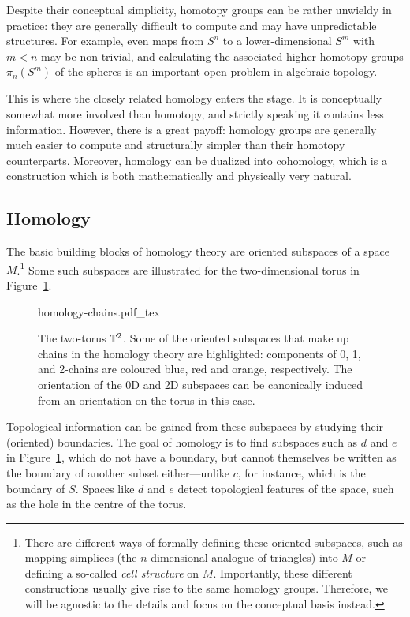Despite their conceptual simplicity, homotopy groups can be rather unwieldy in practice: they are generally difficult to compute and may have unpredictable structures. For example, even maps from $S^n$ to a lower-dimensional $S^m$ with $m<n$ may be non-trivial, and calculating the associated higher homotopy groups $\pi_n(S^m)$ of the spheres is an important open problem in algebraic topology.

This is where the closely related homology enters the stage. It is conceptually somewhat more involved than homotopy, and strictly speaking it contains less information. However, there is a great payoff: homology groups are generally much easier to compute and structurally simpler than their homotopy counterparts. Moreover, homology can be dualized into cohomology, which is a construction which is both mathematically and physically very natural.


\subsection{Homology}

The basic building blocks of homology theory are oriented subspaces of a space $M$.\footnote{
	There are different ways of formally defining these oriented subspaces, such as mapping simplices (the $n$-dimensional analogue of triangles) into $M$ or defining a so-called \emph{cell structure} on $M$. Importantly, these different constructions usually give rise to the same homology groups. Therefore, we will be agnostic to the details and focus on the conceptual basis instead.} %
Some such subspaces are illustrated for the two-dimensional torus in Figure~\ref{fig:homology-chains}.
\begin{figure}[htb!]
	\centering
	\def\svgwidth{.6\linewidth}
	{homology-chains.pdf_tex}
	\caption{The two-torus $\mathbb{T}^2$. Some of the oriented subspaces that make up chains in the homology theory are highlighted: components of 0, 1, and 2-chains are coloured blue, red and orange, respectively. The orientation of the 0D and 2D subspaces can be canonically induced from an orientation on the torus in this case.}
	\label{fig:homology-chains}
\end{figure}
Topological information can be gained from these subspaces by studying their (oriented) boundaries. The goal of homology is to find subspaces such as $d$ and $e$ in Figure~\ref{fig:homology-chains}, which do not have a boundary, but cannot themselves be written as the boundary of another subset either---unlike $c$, for instance, which is the boundary of $S$. Spaces like $d$ and $e$ detect topological features of the space, such as the hole in the centre of the torus.

